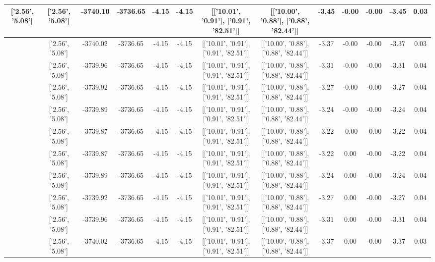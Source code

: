\begin{table}[htbp]
\begin{adjustbox}{angle=90}
\begin{tabular}{|c|c|c|c|c|c|c|c|c|c|c|c|c|}
 ['2.56', '5.08'] & ['2.56', '5.08'] & -3740.10 & -3736.65 & -4.15 & -4.15 & [['10.01', '0.91'], ['0.91', '82.51']] & [['10.00', '0.88'], ['0.88', '82.44']] & -3.45 & -0.00 & -0.00 & -3.45 & 0.03\\ \hline
 ['2.56', '5.08'] & ['2.56', '5.08'] & -3740.02 & -3736.65 & -4.15 & -4.15 & [['10.01', '0.91'], ['0.91', '82.51']] & [['10.00', '0.88'], ['0.88', '82.44']] & -3.37 & -0.00 & -0.00 & -3.37 & 0.03\\ \hline
 ['2.56', '5.08'] & ['2.56', '5.08'] & -3739.96 & -3736.65 & -4.15 & -4.15 & [['10.01', '0.91'], ['0.91', '82.51']] & [['10.00', '0.88'], ['0.88', '82.44']] & -3.31 & -0.00 & -0.00 & -3.31 & 0.04\\ \hline
 ['2.56', '5.08'] & ['2.56', '5.08'] & -3739.92 & -3736.65 & -4.15 & -4.15 & [['10.01', '0.91'], ['0.91', '82.51']] & [['10.00', '0.88'], ['0.88', '82.44']] & -3.27 & -0.00 & -0.00 & -3.27 & 0.04\\ \hline
 ['2.56', '5.08'] & ['2.56', '5.08'] & -3739.89 & -3736.65 & -4.15 & -4.15 & [['10.01', '0.91'], ['0.91', '82.51']] & [['10.00', '0.88'], ['0.88', '82.44']] & -3.24 & -0.00 & -0.00 & -3.24 & 0.04\\ \hline
 ['2.56', '5.08'] & ['2.56', '5.08'] & -3739.87 & -3736.65 & -4.15 & -4.15 & [['10.01', '0.91'], ['0.91', '82.51']] & [['10.00', '0.88'], ['0.88', '82.44']] & -3.22 & -0.00 & -0.00 & -3.22 & 0.04\\ \hline
 ['2.56', '5.09'] & ['2.56', '5.08'] & -3739.87 & -3736.65 & -4.15 & -4.15 & [['10.01', '0.91'], ['0.91', '82.51']] & [['10.00', '0.88'], ['0.88', '82.44']] & -3.22 & 0.00 & -0.00 & -3.22 & 0.04\\ \hline
 ['2.56', '5.09'] & ['2.56', '5.08'] & -3739.89 & -3736.65 & -4.15 & -4.15 & [['10.01', '0.91'], ['0.91', '82.51']] & [['10.00', '0.88'], ['0.88', '82.44']] & -3.24 & 0.00 & -0.00 & -3.24 & 0.04\\ \hline
 ['2.57', '5.09'] & ['2.56', '5.08'] & -3739.92 & -3736.65 & -4.15 & -4.15 & [['10.01', '0.91'], ['0.91', '82.51']] & [['10.00', '0.88'], ['0.88', '82.44']] & -3.27 & 0.00 & -0.00 & -3.27 & 0.04\\ \hline
 ['2.57', '5.09'] & ['2.56', '5.08'] & -3739.96 & -3736.65 & -4.15 & -4.15 & [['10.01', '0.91'], ['0.91', '82.51']] & [['10.00', '0.88'], ['0.88', '82.44']] & -3.31 & 0.00 & -0.00 & -3.31 & 0.04\\ \hline
 ['2.57', '5.09'] & ['2.56', '5.08'] & -3740.02 & -3736.65 & -4.15 & -4.15 & [['10.01', '0.91'], ['0.91', '82.51']] & [['10.00', '0.88'], ['0.88', '82.44']] & -3.37 & 0.00 & -0.00 & -3.37 & 0.03\\ \hline

\end{tabular}
\end{adjustbox}
\end{table}
